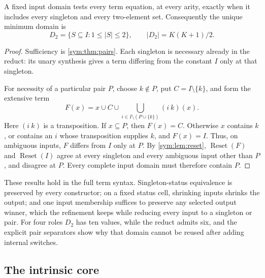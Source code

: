 \begin{proposition}\label{sym:thm:optimal}
A fixed input domain tests every term equation, at every arity, exactly
when it includes every singleton and every two-element set. Consequently
the unique minimum domain is
\[
 D_2=\{S\subseteq I:1\leq|S|\leq2\},\qquad |D_2|=K(K+1)/2.
\]
\end{proposition}
\begin{proof}
Sufficiency is \cref{sym:thm:pairs}. Each singleton is necessary
already in the reduct: its unary synthesis gives a term differing from
the constant $I$ only at that singleton.

For necessity of a particular pair $P$, choose $k\notin P$, put
$C=I\setminus\{k\}$, and form the extensive term
\[
 F(x)=x\cup C\cup\bigcup_{i\in I\setminus(P\cup\{k\})}(i\ k)(x).
\]
Here $(i\ k)$ is a transposition. If $x\subseteq P$, then $F(x)=C$.
Otherwise $x$ contains $k$, or contains an $i$ whose transposition
supplies $k$, and $F(x)=I$. Thus, on ambiguous inputs, $F$ differs from
$I$ only at $P$. By \cref{sym:lem:reset},
$\operatorname{Reset}(F)$ and $\operatorname{Reset}(I)$ agree at every
singleton and every ambiguous input other than $P$, and disagree at
$P$. Every complete input domain must therefore contain $P$.
\end{proof}

These results hold in the full term syntax. Singleton-status equivalence is preserved by every constructor; on a fixed status cell, shrinking inputs shrinks the output; and one input membership suffices to preserve any selected output
winner, which the refinement keeps while reducing every input to a singleton or pair. For four roles $D_2$ has ten values, while the reduct admits six, and the
explicit pair separators show why that domain cannot be reused after adding internal switches.

\subsection{The intrinsic core}\label{app:proofs-core}

